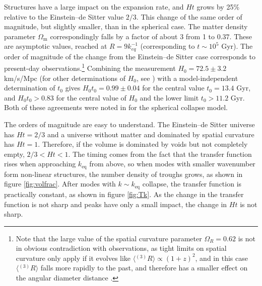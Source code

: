 \documentclass[11pt, a4paper]{article}
\newcommand{\fig}[1]{figure \ref{#1}}
\newcommand{\keq}{k_{\mathrm{eq}}}
\newcommand{\av}[1]{\langle{#1}\rangle}
\newcommand{\sR}{{^{(3)}R}}
\newcommand{\Om}{\Omega_{\mathrm{m}}}
\newcommand{\OR}{\Omega_{R}}
\begin{document}
Structures have a large impact on the expansion rate, and $Ht$ grows by 25\% relative to the Einstein--de Sitter value $2/3$. This change of the same order of magnitude, but slightly smaller, than in the spherical case. The matter density parameter $\Om$ correspondingly falls by a factor of about 3 from 1 to $0.37$. These are asymptotic values, reached at $R= 9 k_{eq}^{-1}$ (corresponding to $t\sim10^5$ Gyr). The order of magnitude of the change from the Einstein--de Sitter case corresponds to present-day observations.\footnote{Note that the large value of the spatial curvature parameter $\OR=0.62$ is not in obvious contradiction with observations, as tight limits on spatial curvature \cite{Clarkson:2011gm, Okouma:2012dy, Ade:2015xua} only apply if it evolves like $\av{\sR}\propto(1+z)^2$, and in this case $\av{\sR}$ falls more rapidly to the past, and therefore has a smaller effect on the angular diameter distance \cite{Boehm:2013qqa}.} Combining the measurement $H_0=72.5\pm3.2$ km/s/Mpc \cite{Zhang:2017aqn} (for other determinations of $H_0$, see \cite{Efstathiou:2013via, *Riess:2016jrr, *Cardona:2016ems, *Follin:2017ljs, *Feeney:2017sgx}) with a model-independent determination of $t_0$ \cite{Krauss:2003} gives  $H_0 t_0=0.99\pm0.04$ for the central value $t_0=13.4$ Gyr, and $H_0t_0>0.83$ for the central value of $H_0$ and the lower limit $t_0>11.2$ Gyr.
Both of these agreements were noted in \cite{Rasanen:2008it} for the spherical collapse model.

The orders of magnitude are easy to understand. The Einstein--de Sitter universe has $Ht=2/3$ and a universe without matter and dominated by spatial curvature has $Ht=1$. Therefore, if the volume is dominated by voids but not completely empty, $2/3<Ht<1$.
The timing comes from the fact that the transfer function rises when approaching $\keq$ from above, so when modes with smaller wavenumber form non-linear structures, the number density of troughs grows, as shown in \fig{fig:volfrac}. After modes with $k\sim\keq$ collapse, the transfer function is practically constant, as shown in \fig{fig:Tk}. As the change in the transfer function is not sharp and peaks have only a small impact, the change in $Ht$ is not sharp.
\end{document}
